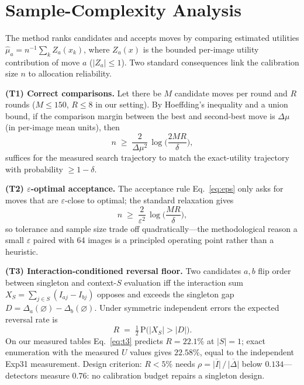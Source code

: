 \section{Sample-Complexity Analysis}
\label{sec:theory}

The method ranks candidates and accepts moves by comparing
estimated utilities $\hat\mu_a = n^{-1}\sum_k Z_a(x_k)$, where $Z_a(x)$
is the bounded per-image utility contribution of move $a$
($|Z_a|\leq 1$). Two standard consequences link the calibration size
$n$ to allocation reliability.

\smallskip
\noindent\textbf{(T1) Correct comparisons.}
Let there be $M$ candidate moves per round and $R$ rounds
($M\!\leq\!150$, $R\!\leq\!8$ in our setting). By Hoeffding's inequality
\cite{hoe} and a union bound, if the comparison margin between the best
and second-best move is $\Delta\mu$ (in per-image mean units), then
\begin{equation}
n \;\geq\; \frac{2}{\Delta\mu^{2}}\,
\log\!\Big(\frac{2MR}{\delta}\Big),
\label{eq:t1}
\end{equation}
suffices for the measured search trajectory to match the
exact-utility trajectory with probability $\geq 1-\delta$.

\smallskip
\noindent\textbf{(T2) $\varepsilon$-optimal acceptance.}
The acceptance rule Eq.~\eqref{eq:eps} only asks for moves that are
$\varepsilon$-close to optimal; the standard relaxation gives
\begin{equation}
n \;\geq\; \frac{2}{\varepsilon^{2}}\,
\log\!\Big(\frac{MR}{\delta}\Big),
\label{eq:t2}
\end{equation}
so tolerance and sample size trade off quadratically---the
methodological reason a small $\varepsilon$ paired with 64 images is a
principled operating point rather than a heuristic.

\smallskip
\noindent\textbf{(T3) Interaction-conditioned reversal floor.}
Two candidates $a,b$ flip order between singleton and context-$S$
evaluation iff the interaction sum
$X_S=\sum_{j\in S}(I_{aj}-I_{bj})$ opposes and exceeds the singleton gap
$D=\Delta_a(\varnothing)-\Delta_b(\varnothing)$. Under symmetric
independent errors the expected reversal rate is
\begin{equation}
R \;=\; \tfrac12\, \mathrm{P}\big(|X_S| > |D|\big).
\label{eq:t3}
\end{equation}
On our measured tables Eq.~\eqref{eq:t3} predicts $R=22.1\%$ at
$|S|{=}1$; exact enumeration with the measured $U$ values gives
$22.58\%$, equal to the independent Exp31 measurement. Design criterion: $R<5\%$ needs
$\rho=\overline{|I|}\,/\,\overline{|\Delta|}$ below $0.134$---detectors
  measure $0.76$: no calibration budget repairs a singleton design.

